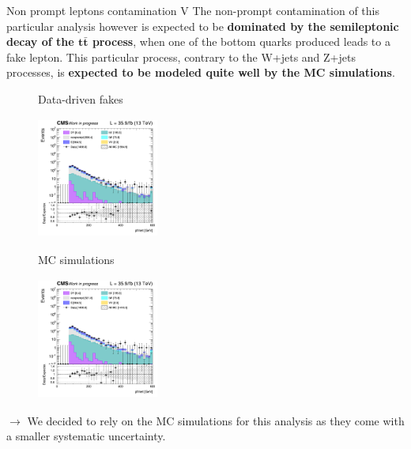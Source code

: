 \documentclass[8pt]{beamer}
\begin{document}
\begin{frame}{Non prompt leptons contamination V}
\justifying
The non-prompt contamination of this particular analysis however is expected to be \textbf{dominated by the semileptonic decay of the $\bm{t \bar t}$ process}, when one of the bottom quarks produced leads to a fake lepton. \vfill
This particular process, contrary to the W+jets and Z+jets processes, is \textbf{expected to be modeled quite well by the MC simulations}. \vfill

\begin{figure}[htbp]
\centering
\begin{minipage}[b]{.49\textwidth}
\begin{center}
\begin{block}{ \centering Data-driven fakes}\end{block} \vspace{5pt}
\includegraphics[width=4cm, height=4cm]{figs/log_cratio_SSCR_ll_pfmet_datadriven.png}
\end{center}
\end{minipage}\hfill
\begin{minipage}[b]{.49\textwidth}
\begin{center}
\begin{block}{ \centering MC simulations}\end{block} \vspace{5pt}
\includegraphics[width=4cm, height=4cm]{figs/log_cratio_SSCR_ll_pfmet_MC.png}
\end{center}
\end{minipage} \hfill
\label{fig:fakes}
\end{figure}

$\rightarrow$ We decided to \alert{rely on the MC simulations} for this analysis as they come with a smaller systematic uncertainty. \vfill
\end{frame}
\end{document}
